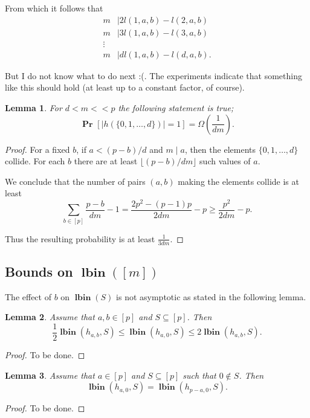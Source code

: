 \documentclass{article}
\newcommand{\lbin}[2]{\operatorname{\mathbf{lbin}}({#1}, {#2})}
\newcommand{\vlbin}[1]{\operatorname{\mathbf{lbin}}({#1})}
\newcommand{\probs}[2]{\operatorname{\mathbf{Pr}}_{{#1}}\left[{#2}\right]}
\newcommand{\prob}[1]{\probs{}{#1}}
\newtheorem{lemma}{Lemma}
\begin{document}
From which it follows that
\begin{align*}
m & \mid 2l(1, a, b) - l(2, a, b) \\
m & \mid 3l(1, a, b) - l(3, a, b) \\
\vdots & \\
m & \mid dl(1, a, b) - l(d, a, b).
\end{align*}

But I do not know what to do next :(.
The experiments indicate that something like this should hold (at least up to a constant factor, of course).

\begin{lemma}
\label{lm:0-d-prob-lower-bound}
For $d < m << p$ the following statement is true;
\[
\prob{|h(\{0, 1, \ldots, d\})| = 1} = \Omega\left(\frac{1}{dm}\right).
\]
\end{lemma}
\begin{proof}
For a fixed $b$, if $a < (p - b)/d$ and $m \mid a$, then the elements $\{0, 1, \ldots, d\}$ collide.
For each $b$ there are at least $\lfloor (p - b)/dm \rfloor$ such values of $a$.

We conclude that the number of pairs $(a, b)$ making the elements collide is at least
\[
\sum_{b \in [p]} \frac{p - b}{dm} - 1 = \frac{2p ^ 2 - (p - 1)p}{2dm} - p \geq \frac{p ^ 2}{2dm} - p.
\]

Thus the resulting probability is at least $\frac{1}{3dm}$.
\end{proof}

\subsection{Bounds on $\vlbin{[m]}$}

The effect of $b$ on $\vlbin{S}$ is not asymptotic as stated in the following lemma.
\begin{lemma}
\label{lm:b-zero}
Assume that  $a, b \in [p]$ and $S \subseteq [p]$. Then \[ \frac{1}{2} \lbin{h_{a, b}}{S} \leq \lbin{h_{a, 0}}{S} \leq 2\lbin{h_{a, b}}{S} . \]
\end{lemma}
\begin{proof}
To be done.
\end{proof}

\begin{lemma}
Assume that  $a \in [p]$ and $S \subseteq [p]$ such that $0 \not\in S$. Then \[ \lbin{h_{a, 0}}{S} = \lbin{h_{p - a, 0}}{S} . \]
\end{lemma}
\begin{proof}
To be done.
\end{proof}
\end{document}
